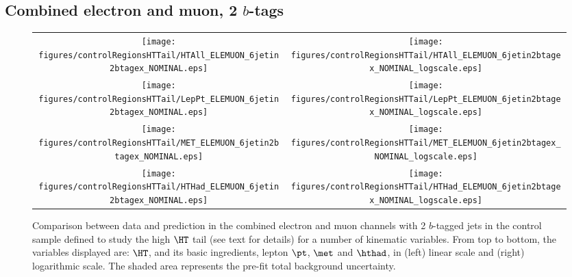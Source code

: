 \clearpage
\subsection{Combined electron and muon, 2 $b$-tags}
\label{sec:ELEMUON_controlHTTail_2tagex}

\begin{figure}[htbp]
\begin{center}
\begin{tabular}{cc}
%
\texttt{[image: figures/controlRegionsHTTail/HTAll\_ELEMUON\_6jetin2btagex\_NOMINAL.eps]} &
\texttt{[image: figures/controlRegionsHTTail/HTAll\_ELEMUON\_6jetin2btagex\_NOMINAL\_logscale.eps]} \\
\texttt{[image: figures/controlRegionsHTTail/LepPt\_ELEMUON\_6jetin2btagex\_NOMINAL.eps]} &
\texttt{[image: figures/controlRegionsHTTail/LepPt\_ELEMUON\_6jetin2btagex\_NOMINAL\_logscale.eps]} \\
\texttt{[image: figures/controlRegionsHTTail/MET\_ELEMUON\_6jetin2btagex\_NOMINAL.eps]} &
\texttt{[image: figures/controlRegionsHTTail/MET\_ELEMUON\_6jetin2btagex\_NOMINAL\_logscale.eps]} \\
\texttt{[image: figures/controlRegionsHTTail/HTHad\_ELEMUON\_6jetin2btagex\_NOMINAL.eps]} &
\texttt{[image: figures/controlRegionsHTTail/HTHad\_ELEMUON\_6jetin2btagex\_NOMINAL\_logscale.eps]} \\

\end{tabular}\caption{\small {Comparison between data and prediction in the combined electron and muon channels with 2 $b$-tagged jets in the control sample
defined to study the high $\HT$ tail (see text for details)  for a number of kinematic
variables. From top to bottom, the variables displayed are: $\HT$, and its basic ingredients, lepton $\pt$, $\met$ and $\hthad$,
in (left) linear scale and (right) logarithmic scale.
The shaded area represents the pre-fit total background uncertainty.}}
\label{fig:ELEMUON_controlHTTail_2btagex_1}
\end{center}
\end{figure}
